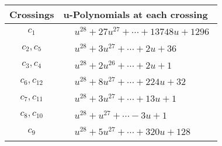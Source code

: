 \documentclass[1p]{elsarticle_modified}
\theoremstyle{definition}
\begin{document}
\begin{tabular}{m{50pt}|m{274pt}}
Crossings & \hspace{64pt}u-Polynomials at each crossing \\
\hline $$\begin{aligned}c_{1}\end{aligned}$$&$\begin{aligned}
&u^{28}+27 u^{27}+\cdots+13748 u+1296
\end{aligned}$\\
\hline $$\begin{aligned}c_{2},c_{5}\end{aligned}$$&$\begin{aligned}
&u^{28}+3 u^{27}+\cdots+2 u+36
\end{aligned}$\\
\hline $$\begin{aligned}c_{3},c_{4}\end{aligned}$$&$\begin{aligned}
&u^{28}+2 u^{26}+\cdots+2 u+1
\end{aligned}$\\
\hline $$\begin{aligned}c_{6},c_{12}\end{aligned}$$&$\begin{aligned}
&u^{28}+8 u^{27}+\cdots+224 u+32
\end{aligned}$\\
\hline $$\begin{aligned}c_{7},c_{11}\end{aligned}$$&$\begin{aligned}
&u^{28}+3 u^{27}+\cdots+13 u+1
\end{aligned}$\\
\hline $$\begin{aligned}c_{8},c_{10}\end{aligned}$$&$\begin{aligned}
&u^{28}+u^{27}+\cdots-3 u+1
\end{aligned}$\\
\hline $$\begin{aligned}c_{9}\end{aligned}$$&$\begin{aligned}
&u^{28}+5 u^{27}+\cdots+320 u+128
\end{aligned}$\\
\hline
\end{tabular}\\~\\
\newpage\renewcommand{\arraystretch}{1}
\end{document}
